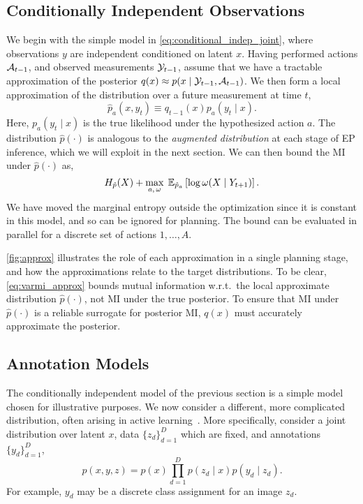 \subsection{Conditionally Independent Observations}

We begin with the simple model in
\EQN\ref{eq:conditional_indep_joint}, where observations $y$ are
independent conditioned on latent $x$.  Having performed actions
$\mathcal{A}_{t-1}$, and observed measurements $\mathcal{Y}_{t-1}$, assume that we
have a tractable approximation of the posterior \mbox{$q(x) \approx
  p(x \mid \mathcal{Y}_{t-1}, \mathcal{A}_{t-1})$}.  We then form a local
approximation of the distribution over a future measurement at time
$t$,
\begin{equation}\label{eq:local_approx}
  \hat{p}_{a}(x,y_t) \equiv q_{t-1}(x) p_{a}(y_t \mid x).
\end{equation}
Here, $p_{a}(y_t \mid x)$ is the true likelihood under the
hypothesized action $a$.  The distribution $\hat{p}(\cdot)$ is
analogous to the \emph{augmented distribution} at each stage of EP
inference, which we will exploit in the next section.  We can then
bound the MI under $\hat{p}(\cdot)$ as,
\begin{equation}\label{eq:varmi_approx}
  H_{\hat{p}}(X) + \max_{a, \,\omega}  \;\mathbb{E}_{\hat{p}_a}\left[ \log \omega(X \mid Y_{t+1})
  \right].
\end{equation}
We have moved the marginal entropy outside the optimization since it is
constant in this model, and so can be ignored for planning.  The bound
can be evaluated in parallel for a discrete set of actions
$1,\ldots,A$.

\FIG\ref{fig:approx} illustrates the role of each approximation in a
single planning stage, and how the approximations relate to the target
distributions.  To be clear, \EQN\eqref{eq:varmi_approx} bounds mutual
information w.r.t.~the local approximate distribution
$\hat{p}(\cdot)$, not MI under the true posterior.  To ensure that MI
under $\hat{p}(\cdot)$ is a reliable surrogate for posterior MI,
$q(x)$ must accurately approximate the posterior.

\subsection{Annotation Models}\label{sec:annotation}

The conditionally independent model of the previous section is a
simple model chosen for illustrative purposes.  We now consider a
different, more complicated distribution, often arising in active
learning~\citep{settles2012active}.  More specifically, consider a
joint distribution over latent $x$, data $\{z_d\}_{d=1}^D$ which are
fixed, and annotations $\{y_d\}_{d=1}^D$,
\[
  p(x,y,z) = p(x) \prod_{d=1}^D p(z_d \mid x) p(y_d \mid z_d). 
\]
For example, $y_d$ may be a discrete class assignment for an image
$z_d$.  

